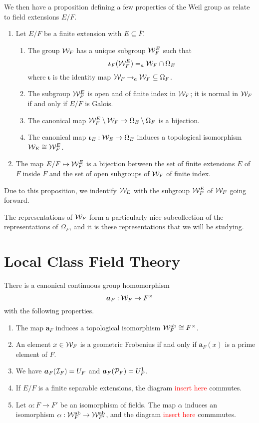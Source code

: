 We then have a proposition defining a few properties of the Weil group as relate to field extensions $E/F$.
\begin{prop}
  \begin{enumerate}
    \item Let $E/F$ be a finite extension with $E \subseteq \overline{F}$.
    \begin{enumerate}
      \item The group $\mathcal{W}_F$ has a unique subgroup $\mathcal{W}^E_F$ such that \[\bm{\iota}_F(\mathcal{W}^E_F) = _a\mathcal{W}_F \cap \Omega_E\] where $\bm{\iota}$ is the identity map $\mathcal{W}_F \to _a\mathcal{W}_F \subseteq \Omega_F$.
      \item The subgroup $\mathcal{W}^E_F$ is open and of finite index in $\mathcal{W}_F$; it is normal in $\mathcal{W}_F$ if and only if $E/F$ is Galois.
      \item The canonical map $\mathcal{W}^E_F\setminus \mathcal{W}_F \to \Omega_E \setminus \Omega_F$ is a bijection.
      \item The canonical map $\bm{\iota}_E : \mathcal{W}_E \to \Omega_E$ induces a topological isomorphism $\mathcal{W}_E \cong \mathcal{W}^E_F$.
    \end{enumerate}
    \item The map $E/F \mapsto \mathcal{W}^E_F$ is a bijection between the set of finite extensions $E$ of $F$ inside $\overline{F}$ and the set of open subgroups of $\mathcal{W}_F$ of finite index.
  \end{enumerate}
\end{prop}

Due to this proposition, we indentify $\mathcal{W}_E$ with the subgroup $\mathcal{W}^E_F$ of $\mathcal{W}_F$ going forward.



The representations of $\mathcal{W}_F$ form a particularly nice subcollection of the representations of $\Omega_F$, and it is these representations that we will be studying.
\section{Local Class Field Theory}
\label{sec:LCFT}
\begin{theorem}
\label{thm:LCFT}
  There is a canonical continuous group homomorphism
  \[\bm{a}_F : \mathcal{W}_F \to F^\times\]
  with the following properties.
  \begin{enumerate}
    \item The map $\bm{a}_F$ induces a topological isomorphism $\mathcal{W}_F^{\text{ab}} \cong F^\times$.
    \item An element $x \in \mathcal{W}_F$ is a geometric Frobenius if and only if $\bm{a}_F(x)$ is a prime element of $F$.
    \item We have $\bm{a}_F(\mathcal{I}_F) = U_F$ and $\bm{a}_F(\mathcal{P}_F) = U^1_F$.
    \item If $E/F$ is a finite separable extensions, the diagram \textcolor{red}{insert here} commutes.
    \item Let $\alpha : F \to F'$ be an isomorphism of fields. The map $\alpha$ induces an isomorphism $\alpha: \mathcal{W}^{\text{ab}}_F \to \mathcal{W}^{\text{ab}}_{F'}$, and the diagram \textcolor{red}{insert here} commmutes.
  \end{enumerate}
\end{theorem}

